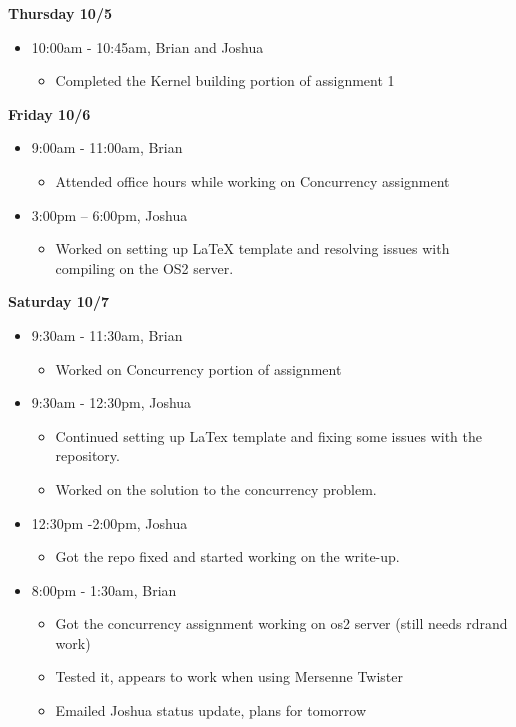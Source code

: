 \documentclass[letterpaper, onecolumn, draftclsnofoot, 10pt, compsoc]{IEEEtran}
\begin{document}
    \textbf{Thursday 10/5}
        \begin{itemize}
            \item 10:00am - 10:45am, Brian and Joshua
            \begin{itemize}
                \item Completed the Kernel building portion of assignment 1
            \end{itemize}
        \end{itemize}
    \textbf{Friday 10/6}
        \begin{itemize}
            \item 9:00am - 11:00am, Brian
            \begin{itemize}
                \item Attended office hours while working on Concurrency assignment
            \end{itemize}
            \item 3:00pm – 6:00pm, Joshua
                \begin{itemize}
                    \item Worked on setting up LaTeX template and resolving issues with compiling on the OS2 server.
                \end{itemize}
        \end{itemize}
    \textbf{Saturday 10/7}
        \begin{itemize}
            \item 9:30am - 11:30am, Brian
            \begin{itemize}
                \item Worked on Concurrency portion of assignment 
            \end{itemize}
            \item 9:30am - 12:30pm, Joshua
                \begin{itemize}
                    \item Continued setting up LaTex template and fixing some issues with the repository.
                    \item Worked on the solution to the concurrency problem.
                \end{itemize}
            \item 12:30pm -2:00pm, Joshua
                \begin{itemize}
                    \item Got the repo fixed and started working on the write-up.
                \end{itemize}
            \item 8:00pm - 1:30am, Brian
                \begin{itemize}
                    \item Got the concurrency assignment working on os2 server (still needs rdrand work)
                    \item Tested it, appears to work when using Mersenne Twister
                    \item Emailed Joshua status update, plans for tomorrow
                \end{itemize}
        \end{itemize}
\end{document}
